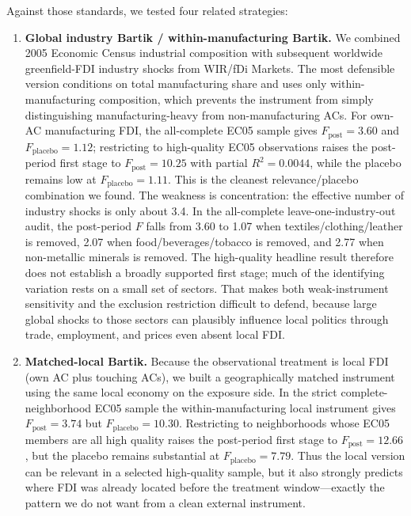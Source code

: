 \documentclass[11pt]{article}
\begin{document}
Against those standards, we tested four related strategies:

\begin{enumerate}[label=\arabic*.,leftmargin=2.1em]
\item \textbf{Global industry Bartik / within-manufacturing Bartik.} We combined 2005 Economic Census industrial composition with subsequent worldwide greenfield-FDI industry shocks from WIR/fDi Markets. The most defensible version conditions on total manufacturing share and uses only within-manufacturing composition, which prevents the instrument from simply distinguishing manufacturing-heavy from non-manufacturing ACs. For own-AC manufacturing FDI, the all-complete EC05 sample gives $F_{\text{post}}=3.60$ and $F_{\text{placebo}}=1.12$; restricting to high-quality EC05 observations raises the post-period first stage to $F_{\text{post}}=10.25$ with partial $R^2=0.0044$, while the placebo remains low at $F_{\text{placebo}}=1.11$. This is the cleanest relevance/placebo combination we found. The weakness is concentration: the effective number of industry shocks is only about 3.4. In the all-complete leave-one-industry-out audit, the post-period $F$ falls from 3.60 to 1.07 when textiles/clothing/leather is removed, 2.07 when food/beverages/tobacco is removed, and 2.77 when non-metallic minerals is removed. The high-quality headline result therefore does not establish a broadly supported first stage; much of the identifying variation rests on a small set of sectors. That makes both weak-instrument sensitivity and the exclusion restriction difficult to defend, because large global shocks to those sectors can plausibly influence local politics through trade, employment, and prices even absent local FDI.

\item \textbf{Matched-local Bartik.} Because the observational treatment is local FDI (own AC plus touching ACs), we built a geographically matched instrument using the same local economy on the exposure side. In the strict complete-neighborhood EC05 sample the within-manufacturing local instrument gives $F_{\text{post}}=3.74$ but $F_{\text{placebo}}=10.30$. Restricting to neighborhoods whose EC05 members are all high quality raises the post-period first stage to $F_{\text{post}}=12.66$, but the placebo remains substantial at $F_{\text{placebo}}=7.79$. Thus the local version can be relevant in a selected high-quality sample, but it also strongly predicts where FDI was already located before the treatment window---exactly the pattern we do not want from a clean external instrument.


\end{enumerate}
\end{document}
